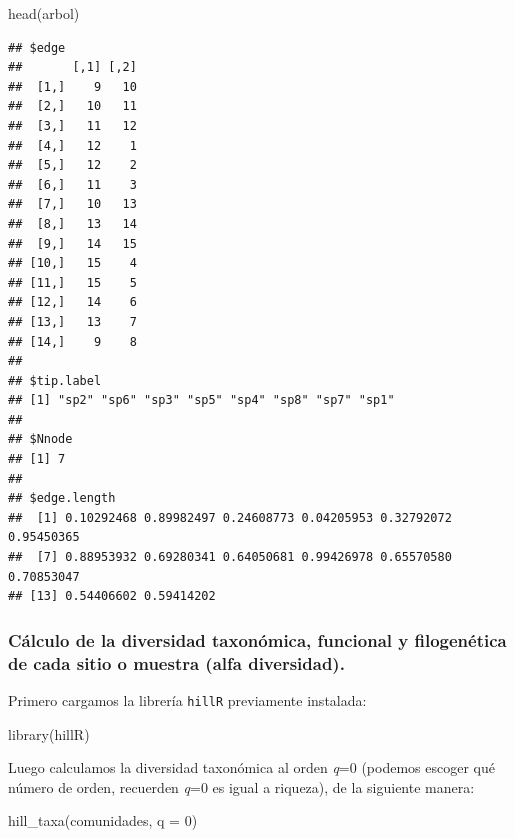 \documentclass[
]{article}
\newenvironment{Shaded}{\begin{snugshade}}{\end{snugshade}}
\newcommand{\AttributeTok}[1]{\textcolor[rgb]{0.77,0.63,0.00}{#1}}
\newcommand{\DecValTok}[1]{\textcolor[rgb]{0.00,0.00,0.81}{#1}}
\newcommand{\FunctionTok}[1]{\textcolor[rgb]{0.00,0.00,0.00}{#1}}
\newcommand{\NormalTok}[1]{#1}
\begin{document}
\hfill\break

\begin{Shaded}
\begin{Highlighting}[]
 \FunctionTok{head}\NormalTok{(arbol)}
\end{Highlighting}
\end{Shaded}

\begin{verbatim}
## $edge
##       [,1] [,2]
##  [1,]    9   10
##  [2,]   10   11
##  [3,]   11   12
##  [4,]   12    1
##  [5,]   12    2
##  [6,]   11    3
##  [7,]   10   13
##  [8,]   13   14
##  [9,]   14   15
## [10,]   15    4
## [11,]   15    5
## [12,]   14    6
## [13,]   13    7
## [14,]    9    8
## 
## $tip.label
## [1] "sp2" "sp6" "sp3" "sp5" "sp4" "sp8" "sp7" "sp1"
## 
## $Nnode
## [1] 7
## 
## $edge.length
##  [1] 0.10292468 0.89982497 0.24608773 0.04205953 0.32792072 0.95450365
##  [7] 0.88953932 0.69280341 0.64050681 0.99426978 0.65570580 0.70853047
## [13] 0.54406602 0.59414202
\end{verbatim}

\hypertarget{cuxe1lculo-de-la-diversidad-taxonuxf3mica-funcional-y-filogenuxe9tica-de-cada-sitio-o-muestra-alfa-diversidad.}{%
\subsubsection{Cálculo de la diversidad taxonómica, funcional y
filogenética de cada sitio o muestra (alfa
diversidad).}\label{cuxe1lculo-de-la-diversidad-taxonuxf3mica-funcional-y-filogenuxe9tica-de-cada-sitio-o-muestra-alfa-diversidad.}}

Primero cargamos la librería \texttt{hillR} previamente instalada:

\begin{Shaded}
\begin{Highlighting}[]
\FunctionTok{library}\NormalTok{(hillR)}
\end{Highlighting}
\end{Shaded}

Luego calculamos la diversidad taxonómica al orden \emph{q}=0 (podemos
escoger qué número de orden, recuerden \emph{q}=0 es igual a riqueza),
de la siguiente manera:

\begin{Shaded}
\begin{Highlighting}[]
\FunctionTok{hill\_taxa}\NormalTok{(comunidades, }\AttributeTok{q =} \DecValTok{0}\NormalTok{)}
\end{Highlighting}
\end{Shaded}
\end{document}
